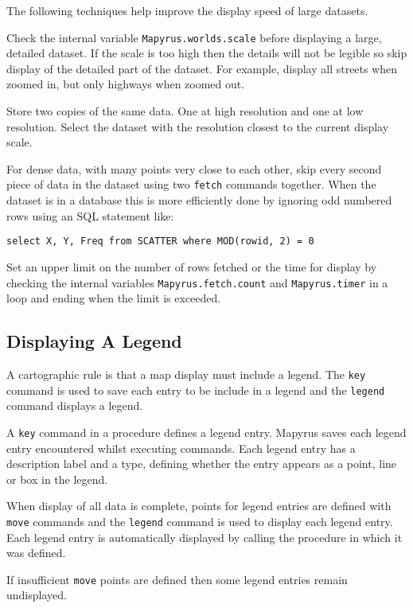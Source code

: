 The following techniques help improve the display speed of large datasets.

Check the internal variable \texttt{Mapyrus.worlds.scale} before displaying a
large, detailed dataset.  If the scale is too high then the details will not be
legible so skip display of the detailed part of the dataset.  For example,
display all streets when zoomed in, but only highways when zoomed out.

Store two copies of the same data.  One at high resolution and one at low
resolution.  Select the dataset with the resolution closest to the current
display scale.

For dense data, with many points very close to each other, skip every second
piece of data in the dataset using two \texttt{fetch} commands together.  When
the dataset is in a database this is more efficiently done by ignoring odd
numbered rows using an SQL statement like:

\begin{verbatim}
select X, Y, Freq from SCATTER where MOD(rowid, 2) = 0
\end{verbatim}

Set an upper limit on the number of rows fetched or the time for display by
checking the internal variables \texttt{Mapyrus.fetch.count} and
\texttt{Mapyrus.timer} in a loop and ending when the limit is exceeded.

\subsection{Displaying A Legend}

A cartographic rule is that a map display must include a legend.  The
\texttt{key} command is used to save each entry to be include in a legend and
the \texttt{legend} command displays a legend.

A \texttt{key} command in a procedure defines a legend entry.  Mapyrus saves
each legend entry encountered whilst executing commands.  Each legend entry has
a description label and a type, defining whether the entry appears as a point,
line or box in the legend.

When display of all data is complete, points for legend entries are defined
with \texttt{move} commands and the \texttt{legend} command is used to display
each legend entry.  Each legend entry is automatically displayed by calling the
procedure in which it was defined.

If insufficient \texttt{move} points are defined then some legend entries
remain undisplayed.

